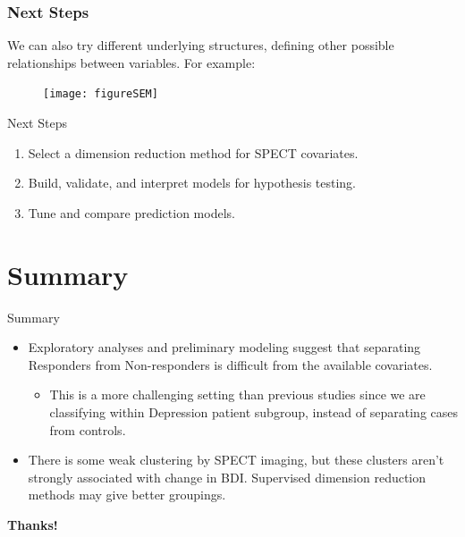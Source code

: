 \documentclass{beamer}
\begin{document}

\begin{frame}
\frametitle{Next Steps}
We can also try different underlying structures, defining other possible relationships between variables. For example:

\begin{figure}
\texttt{[image: figureSEM]}
\end{figure}
\end{frame}

\begin{frame}{Next Steps}
\begin{enumerate}
\item Select a dimension reduction method for SPECT covariates.
\item Build, validate, and interpret models for hypothesis testing.
\item Tune and compare prediction models.
\end{enumerate}
\end{frame}


\section{Summary}
\begin{frame}{Summary}
\begin{itemize}
\item Exploratory analyses and preliminary modeling suggest that separating Responders from Non-responders is difficult from the available covariates.
\begin{itemize}
\item This is a more challenging setting than previous studies since we are classifying within Depression patient subgroup, instead of separating cases from controls.
\end{itemize}
\item There is some weak clustering by SPECT imaging, but these clusters aren't strongly associated with change in BDI.  Supervised dimension reduction methods may give better groupings.
\end{itemize}
\end{frame}

\begin{frame}
\centering
\Large
\textbf{Thanks!}
\end{frame}
\end{document}

